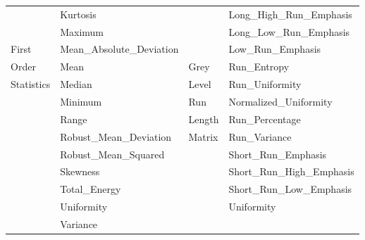 \documentclass[10pt,journal,compsoc]{IEEEtran}
\begin{document}
\begin{table}[!b]
\begin{tabular}{| l | l | l | l |}
&Kurtosis&&Long\_High\_Run\_Emphasis\\
&Maximum&&Long\_Low\_Run\_Emphasis\\
First &Mean\_Absolute\_Deviation&&Low\_Run\_Emphasis\\
Order&Mean&Grey&Run\_Entropy\\
Statistics&Median& Level&Run\_Uniformity\\
&Minimum& Run &Normalized\_Uniformity\\
&Range&Length &Run\_Percentage\\
&Robust\_Mean\_Deviation&Matrix&Run\_Variance\\
&Robust\_Mean\_Squared&&Short\_Run\_Emphasis\\
&Skewness&&Short\_Run\_High\_Emphasis\\
&Total\_Energy&&Short\_Run\_Low\_Emphasis\\
&Uniformity&&Uniformity\\
&Variance&&\\
\hline
\end{tabular}
\end{table}
\end{document}
